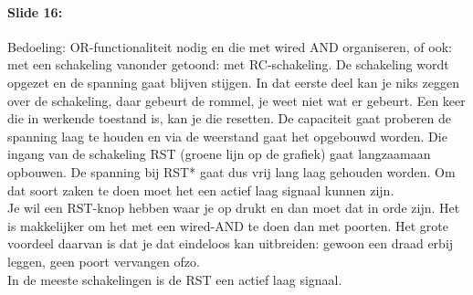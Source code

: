 \documentclass[10pt,a4paper]{book}
\begin{document}
\paragraph{Slide 16:} Bedoeling: OR-functionaliteit nodig en die met wired AND organiseren, of ook: met een schakeling vanonder getoond: met RC-schakeling. De schakeling wordt opgezet en de spanning gaat blijven stijgen. In dat eerste deel kan je niks zeggen over de schakeling, daar gebeurt de rommel, je weet niet wat er gebeurt. Een keer die in werkende toestand is, kan je die resetten. De capaciteit gaat proberen de spanning laag te houden en via de weerstand gaat het opgebouwd worden. Die ingang van de schakeling RST (groene lijn op de grafiek) gaat langzaamaan opbouwen. De spanning bij RST* gaat dus vrij lang laag gehouden worden. Om dat soort zaken te doen moet het een actief laag signaal kunnen zijn. \\
Je wil een RST-knop hebben waar je op drukt en dan moet dat in orde zijn. Het is makkelijker om het met een wired-AND te doen dan met poorten. Het grote voordeel daarvan is dat je dat eindeloos kan uitbreiden: gewoon een draad erbij leggen, geen poort vervangen ofzo. \\
In de meeste schakelingen is de RST een actief laag signaal.
\end{document}
